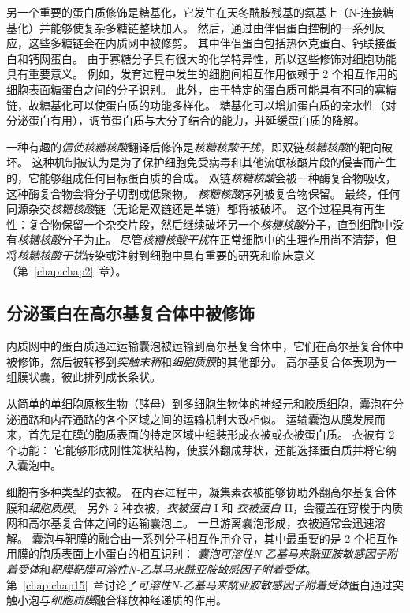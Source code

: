 另一个重要的蛋白质修饰是糖基化，它发生在天冬酰胺残基的氨基上（N-连接糖基化）并能够使复杂多糖链整块加入。
然后，通过由伴侣蛋白控制的一系列反应，这些多糖链会在内质网中被修剪。
其中伴侣蛋白包括热休克蛋白、钙联接蛋白和钙网蛋白。
由于寡糖分子具有很大的化学特异性，所以这些修饰对细胞功能具有重要意义。
例如，发育过程中发生的细胞间相互作用依赖于 2 个相互作用的细胞表面糖蛋白之间的分子识别。
此外，由于特定的蛋白质可能具有不同的寡糖链，故糖基化可以使蛋白质的功能多样化。
糖基化可以增加蛋白质的亲水性（对分泌蛋白有用），调节蛋白质与大分子结合的能力，并延缓蛋白质的降解。


一种有趣的\textit{信使核糖核酸}翻译后修饰是\textit{核糖核酸干扰}，即双链\textit{核糖核酸}的靶向破坏。
这种机制被认为是为了保护细胞免受病毒和其他流氓核酸片段的侵害而产生的，它能够组成任何目标蛋白质的合成。 
双链\textit{核糖核酸}会被一种酶复合物吸收，这种酶复合物会将分子切割成低聚物。
\textit{核糖核酸}序列被复合物保留。
最终，任何同源杂交\textit{核糖核酸}链（无论是双链还是单链）都将被破坏。
这个过程具有再生性：复合物保留一个杂交片段，然后继续破坏另一个\textit{核糖核酸}分子，直到细胞中没有\textit{核糖核酸}分子为止。
尽管\textit{核糖核酸干扰}在正常细胞中的生理作用尚不清楚，但将\textit{核糖核酸干扰}转染或注射到细胞中具有重要的研究和临床意义（第~\ref{chap:chap2}~章）。



\subsection{分泌蛋白在高尔基复合体中被修饰}

内质网中的蛋白质通过运输囊泡被运输到高尔基复合体中，它们在高尔基复合体中被修饰，然后被转移到\textit{突触末稍}和\textit{细胞质膜}的其他部分。
高尔基复合体表现为一组膜状囊，彼此排列成长条状。


从简单的单细胞原核生物（酵母）到多细胞生物体的神经元和胶质细胞，囊泡在分泌通路和内吞通路的各个区域之间的运输机制大致相似。
运输囊泡从膜发展而来，首先是在膜的胞质表面的特定区域中组装形成衣被或衣被蛋白质。
衣被有 2 个功能：
它能够形成刚性笼状结构，使膜外翻成芽状，还能选择蛋白质并将它纳入囊泡中。


细胞有多种类型的衣被。
在内吞过程中，凝集素衣被能够协助外翻高尔基复合体膜和\textit{细胞质膜}。
另外 2 种衣被，\textit{衣被蛋白} I 和 \textit{衣被蛋白} II，会覆盖在穿梭于内质网和高尔基复合体之间的运输囊泡上。
一旦游离囊泡形成，衣被通常会迅速溶解。
囊泡与靶膜的融合由一系列分子相互作用介导，其中最重要的是 2 个相互作用膜的胞质表面上小蛋白的相互识别：
\textit{囊泡可溶性N-乙基马来酰亚胺敏感因子附着受体}和\textit{靶膜靶膜可溶性N-乙基马来酰亚胺敏感因子附着受体}。
第~\ref{chap:chap15}~章讨论了\textit{可溶性N-乙基马来酰亚胺敏感因子附着受体}蛋白通过突触小泡与\textit{细胞质膜}融合释放神经递质的作用。


